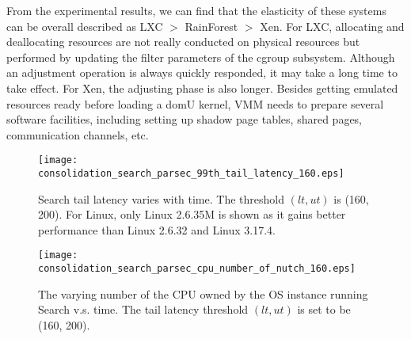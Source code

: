 \documentclass[pageno]{jpaper}
\begin{document}
From the experimental results, we can find that the elasticity of these systems can be overall described as LXC $>$ RainForest $>$ Xen. For LXC, allocating and deallocating  resources are not really conducted on physical resources but performed by updating the filter parameters of the cgroup subsystem. Although an adjustment operation is always quickly responded, it may take a long time to take effect. For Xen, the adjusting phase is also longer. Besides getting emulated resources ready before loading a domU kernel, VMM needs to prepare several software facilities, including setting up shadow page tables, shared pages, communication channels, etc.






















\begin{figure}[t]
\setlength{\abovecaptionskip}{3pt}
\setlength{\belowcaptionskip}{0pt}
  \centering
\texttt{[image: consolidation\_search\_parsec\_99th\_tail\_latency\_160.eps]}
  \caption{Search tail latency varies with time. The threshold $(lt, ut)$ is (160, 200). For Linux, only Linux 2.6.35M is shown as it gains better performance than Linux 2.6.32 and Linux 3.17.4.}
  \label{fig_tail_latency_consolidation_parsec}
\end{figure}


\begin{figure}[t]
\setlength{\abovecaptionskip}{3pt}
\setlength{\belowcaptionskip}{0pt}
  \centering
\texttt{[image: consolidation\_search\_parsec\_cpu\_number\_of\_nutch\_160.eps]}
  \caption{The varying number of the CPU owned by the OS instance running Search v.s. time. The tail latency threshold  $(lt, ut)$ is set to be (160, 200).
}
  \label{fig_cpu_number_of_nutch_consolidation_parsec}
\end{figure}
\end{document}
